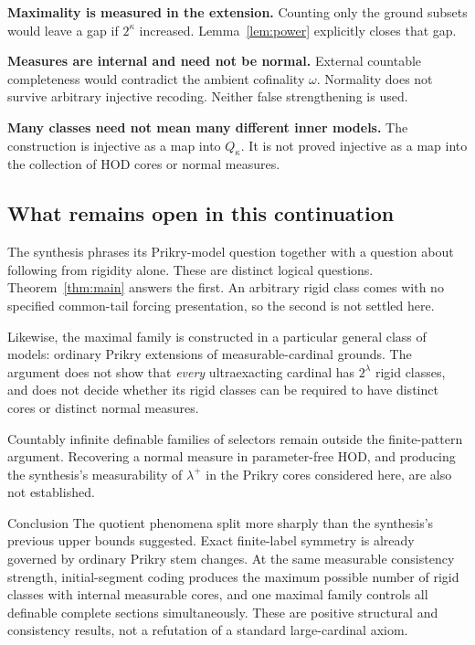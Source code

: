 \documentclass[11pt,letterpaper]{article}
\theoremstyle{definition}
\numberwithin{equation}{section}
\begin{document}
\textbf{Maximality is measured in the extension.} Counting only the ground subsets would leave a gap if $2^\kappa$ increased. Lemma~\ref{lem:power} explicitly closes that gap.

\textbf{Measures are internal and need not be normal.} External countable completeness would contradict the ambient cofinality $\omega$. Normality does not survive arbitrary injective recoding. Neither false strengthening is used.

\textbf{Many classes need not mean many different inner models.} The construction is injective as a map into $Q_\kappa$. It is not proved injective as a map into the collection of HOD cores or normal measures.

\subsection{What remains open in this continuation}

The synthesis phrases its Prikry-model question together with a question about following from rigidity alone. These are distinct logical questions. Theorem~\ref{thm:main} answers the first. An arbitrary rigid class comes with no specified common-tail forcing presentation, so the second is not settled here.

Likewise, the maximal family is constructed in a particular general class of models: ordinary Prikry extensions of measurable-cardinal grounds. The argument does not show that \emph{every} ultraexacting cardinal has $2^\lambda$ rigid classes, and does not decide whether its rigid classes can be required to have distinct cores or distinct normal measures.

Countably infinite definable families of selectors remain outside the finite-pattern argument. Recovering a normal measure in parameter-free HOD, and producing the synthesis's measurability of $\lambda^+$ in the Prikry cores considered here, are also not established.

\begin{assessment}{Conclusion}
The quotient phenomena split more sharply than the synthesis's previous upper bounds suggested. Exact finite-label symmetry is already governed by ordinary Prikry stem changes. At the same measurable consistency strength, initial-segment coding produces the maximum possible number of rigid classes with internal measurable cores, and one maximal family controls all definable complete sections simultaneously. These are positive structural and consistency results, not a refutation of a standard large-cardinal axiom.
\end{assessment}
\end{document}

